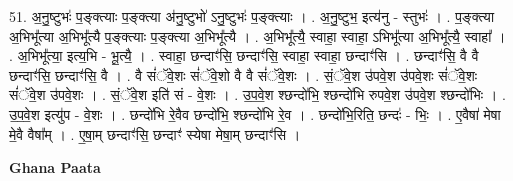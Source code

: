 \documentclass[17pt]{extarticle}
\begin{document}
51. अ॒नु॒ष्टुभः॑ प॒ङ्क्त्याः प॒ङ्क्त्या अ॑नु॒ष्टुभो॑ ऽनु॒ष्टुभः॑ प॒ङ्क्त्याः । . अ॒नु॒ष्टुभ॒ इत्य॑नु - स्तुभः॑ । . प॒ङ्क्त्या अ॒भिभू᳚त्या अ॒भिभू᳚त्यै प॒ङ्क्त्याः प॒ङ्क्त्या अ॒भिभू᳚त्यै । . अ॒भिभू᳚त्यै॒ स्वाहा॒ स्वाहा॒ ऽभिभू᳚त्या अ॒भिभू᳚त्यै॒ स्वाहा᳚ । . अ॒भिभू᳚त्या॒ इत्य॒भि - भू॒त्यै॒ । . स्वाहा॒ छन्दाꣳ॑सि॒ छन्दाꣳ॑सि॒ स्वाहा॒ स्वाहा॒ छन्दाꣳ॑सि । . छन्दाꣳ॑सि॒ वै वै छन्दाꣳ॑सि॒ छन्दाꣳ॑सि॒ वै । . वै सं॑ॅवे॒शः सं॑ॅवे॒शो वै वै सं॑ॅवे॒शः । . सं॒ॅवे॒श उ॑पवे॒श उ॑पवे॒शः सं॑ॅवे॒शः सं॑ॅवे॒श उ॑पवे॒शः । . सं॒ॅवे॒श इति॑ सं - वे॒शः । . उ॒प॒वे॒श श्छन्दो॑भि॒ श्छन्दो॑भि रुपवे॒श उ॑पवे॒श श्छन्दो॑भिः । . उ॒प॒वे॒श इत्यु॑प - वे॒शः । . छन्दो॑भि रे॒वैव छन्दो॑भि॒ श्छन्दो॑भि रे॒व । . छन्दो॑भि॒रिति॒ छन्दः॑ - भिः॒ । . ए॒वैषा॑ मेषा मे॒वै वैषा᳚म् । . ए॒षा॒म् छन्दाꣳ॑सि॒ छन्दाꣳ॑ स्येषा मेषा॒म् छन्दाꣳ॑सि । \newline

\textbf{Ghana Paata } \newline
\end{document}
